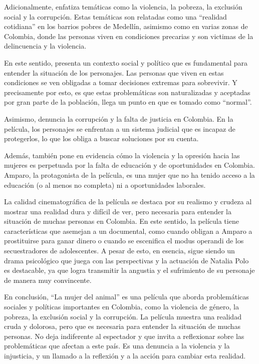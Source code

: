 \documentclass[letterpaper, 12pt]{report}
\begin{document}
Adicionalmente, enfatiza temáticas como la violencia, la
pobreza, la exclusión social y la corrupción. Estas
temáticas son relatadas como una ``realidad cotidiana'' en
los barrios pobres de Medellín, asimismo como en varias
zonas de Colombia, donde las personas viven en condiciones
precarias y son victimas de la delincuencia y la violencia.

En este sentido, presenta un contexto social y político que
es fundamental para entender la situación de los
personajes. Las personas que viven en estas condiciones se
ven obligadas a tomar decisiones extremas para sobrevivir.
Y precisamente por esto, es que estas problemáticas son
naturalizadas y aceptadas por gran parte de la población,
llega un punto en que es tomado como ``normal''.

Asimismo, denuncia la corrupción y la falta de justicia en
Colombia. En la película, los personajes se enfrentan a un
sistema judicial que es incapaz de protegerlos, lo que los
obliga a buscar soluciones por su cuenta.

Además, también pone en evidencia cómo la violencia y la
opresión hacia las mujeres es perpetuada por la falta de
educación y de oportunidades en Colombia. Amparo, la
protagonista de la película, es una mujer que no ha tenido
acceso a la educación (o al menos no completa) ni a
oportunidades laborales.

La calidad cinematográfica de la película se destaca por su
realismo y crudeza al mostrar una realidad dura y difícil
de ver, pero necesaria para entender la situación de muchas
personas en Colombia. En este sentido, la película tiene
características que asemejan a un documental, como cuando
obligan a Amparo a prostituirse para ganar dinero o cuando
se escenifica el modus operandi de los secuestradores de
adolescentes. A pesar de esto, en esencia, sigue siendo un
drama psicológico que juega con las perspectivas y la
actuación de Natalia Polo es destacable, ya que logra
transmitir la angustia y el sufrimiento de su personaje de
manera muy convincente.

En conclusión, ``La mujer del animal'' es una película que
aborda problemáticas sociales y políticas importantes en
Colombia, como la violencia de género, la pobreza, la
exclusión social y la corrupción. La película muestra una
realidad cruda y dolorosa, pero que es necesaria para
entender la situación de muchas personas. No
deja indiferente al espectador y que invita a reflexionar
sobre las problemáticas que afectan a este país. 
Es una denuncia a la violencia y la
injusticia, y un llamado a la reflexión y a la
acción para cambiar esta realidad.

\newpage

\printbibliography
\end{document}
